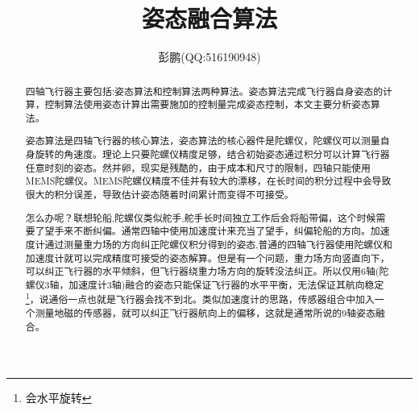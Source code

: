 \documentclass[10pt,a4paper]{article}
\title{姿态融合算法}
\author{彭鹏(QQ:516190948)}
\renewcommand{\citep}[1]{\textsuperscript{\cite{#1}}}
\begin{document}
\maketitle
\newpage
\tableofcontents
\newpage

\begin{abstract}
四轴飞行器主要包括:姿态算法和控制算法两种算法。姿态算法完成飞行器自身姿态的计算，控制算法使用姿态计算出需要施加的控制量完成姿态控制，本文主要分析姿态算法。

姿态算法是四轴飞行器的核心算法，姿态算法的核心器件是陀螺仪，陀螺仪可以测量自身旋转的角速度。理论上只要陀螺仪精度足够，结合初始姿态通过积分可以计算飞行器任意时刻的姿态。然并卵，现实是残酷的，由于成本和尺寸的限制，四轴只能使用MEMS陀螺仪。MEMS陀螺仪精度不佳并有较大的漂移，在长时间的积分过程中会导致很大的积分误差，导致估计姿态随着时间累计而变得不可接受\citep{捷联惯导航}。

怎么办呢？\citep{9轴融合论文}联想轮船,陀螺仪类似舵手,舵手长时间独立工作后会将船带偏，这个时候需要了望手来不断纠偏。通常四轴中使用加速度计来充当了望手，纠偏轮船的方向。加速度计通过测量重力场的方向纠正陀螺仪积分得到的姿态,普通的四轴飞行器使用陀螺仪和加速度计就可以完成精度可接受的姿态解算。但是有一个问题，重力场方向竖直向下，可以纠正飞行器的水平倾斜，但飞行器绕重力场方向的旋转没法纠正。所以仅用6轴(陀螺仪3轴，加速度计3轴)融合的姿态只能保证飞行器的水平平衡，无法保证其航向稳定\footnote{会水平旋转}，说通俗一点也就是飞行器会找不到北。类似加速度计的思路，传感器组合中加入一个测量地磁的传感器\citep{经典博客}，就可以纠正飞行器航向上的偏移，这就是通常所说的9轴姿态融合。
\end{abstract}
\newpage

\end{document}
